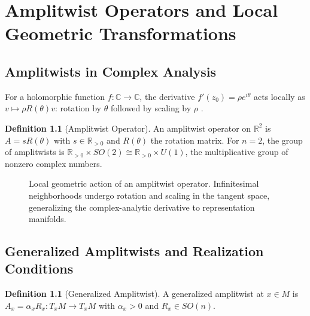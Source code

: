 \documentclass[12pt,a4paper,oneside]{book}
\numberwithin{equation}{chapter}
\theoremstyle{plain}
\theoremstyle{definition}
\newtheorem{definition}[theorem]{Definition}
\theoremstyle{remark}
\begin{document}

\chapter[Amplitwist Operators]{Amplitwist Operators and Local Geometric Transformations}
\label{ch:amplitwist}

\section{Amplitwists in Complex Analysis}

For a holomorphic function $f : \mathbb{C} \rightarrow \mathbb{C}$,
the derivative $f'(z_0) = \rho e^{i\theta}$ acts locally as
$v \mapsto \rho R(\theta) v$: rotation by $\theta$ followed by
scaling by $\rho$ \cite{needham1997}.

\begin{definition}[Amplitwist Operator]
An amplitwist operator on $\mathbb{R}^2$ is
$A = s R(\theta)$ with $s \in \mathbb{R}_{>0}$ and $R(\theta)$ the
rotation matrix. For $n=2$, the group of amplitwists is
$\mathbb{R}_{>0} \times SO(2) \cong \mathbb{R}_{>0} \times U(1)$,
the multiplicative group of nonzero complex numbers.
\end{definition}

\begin{figure}[htbp]
\centering
{}
\caption{Local geometric action of an amplitwist operator.
Infinitesimal neighborhoods undergo rotation and scaling in the
tangent space, generalizing the complex-analytic derivative to
representation manifolds.}
\label{fig:amplitwist-differential}
\end{figure}

\section{Generalized Amplitwists and Realization Conditions}

\begin{definition}[Generalized Amplitwist]
A generalized amplitwist at $x \in M$ is
$A_x = \alpha_x R_x : T_x M \rightarrow T_x M$ with $\alpha_x > 0$
and $R_x \in SO(n)$.
\end{definition}
\end{document}
